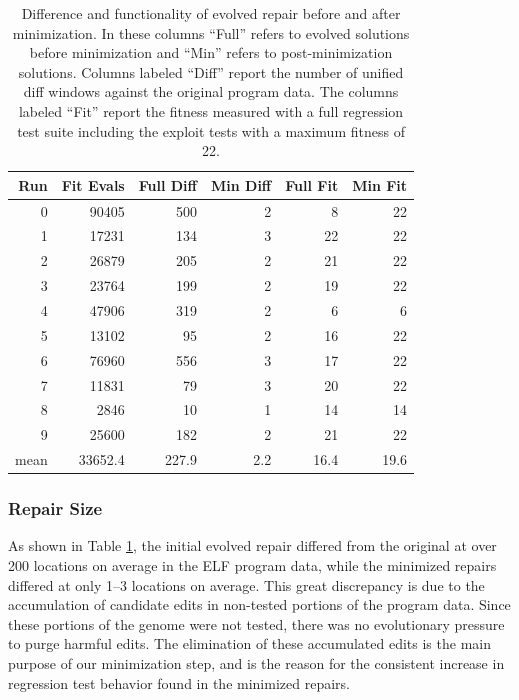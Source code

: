 \documentclass{sigcomm-alternate}
\begin{document}
\begin{table}[htb]
\centering
\begin{tabular}{rrrrrr}
Run  & Fit Evals & Full Diff & Min Diff & Full Fit & Min Fit \\
\toprule
0    & 90405     & 500       & 2        & 8        & 22      \\
1    & 17231     & 134       & 3        & 22       & 22      \\
2    & 26879     & 205       & 2        & 21       & 22      \\
3    & 23764     & 199       & 2        & 19       & 22      \\
4    & 47906     & 319       & 2        & 6        & 6       \\
5    & 13102     & 95        & 2        & 16       & 22      \\
6    & 76960     & 556       & 3        & 17       & 22      \\
7    & 11831     & 79        & 3        & 20       & 22      \\
8    & 2846      & 10        & 1        & 14       & 14      \\
9    & 25600     & 182       & 2        & 21       & 22      \\
\bottomrule
mean & 33652.4   & 227.9     & 2.2      & 16.4     & 19.6    \\
\end{tabular}
\caption{\label{minimized-stats}Difference and functionality of
evolved repair before and after minimization.  In these columns ``Full''
refers to evolved solutions before minimization and ``Min'' refers to
post-minimization solutions.  Columns labeled ``Diff'' report the number
of unified diff windows against the original program data. The columns
labeled ``Fit'' report the fitness measured with a full regression test
suite including the exploit tests with a maximum fitness of 22.}
\end{table}

\subsubsection{Repair Size}
\label{sec-4-2-3}
As shown in Table \ref{minimized-stats}, the initial evolved repair differed
from the original at over 200 locations on average in the ELF program
data, while the minimized repairs differed at only 1--3 locations on
average.  This great discrepancy is due to the accumulation of candidate edits
in non-tested portions of the program data.  Since these portions of
the genome were not tested, there was no evolutionary pressure to purge
harmful edits.  The elimination of these accumulated edits is the main
purpose of our minimization step, and is the reason for the consistent
increase in regression test behavior found in the minimized repairs.
\end{document}
